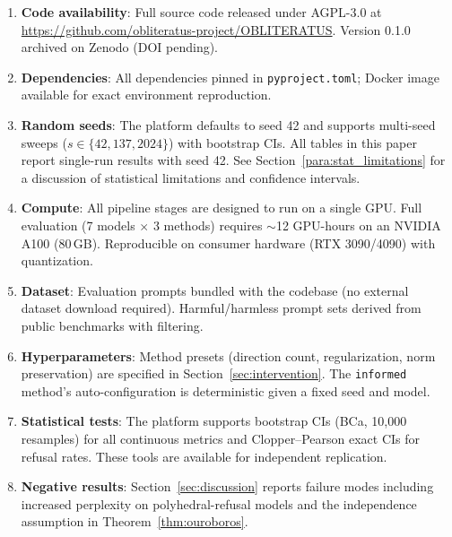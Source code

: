 \begin{enumerate}[leftmargin=*]
\item \textbf{Code availability}: Full source code released under AGPL-3.0 at \url{https://github.com/obliteratus-project/OBLITERATUS}. Version 0.1.0 archived on Zenodo (DOI pending).
\item \textbf{Dependencies}: All dependencies pinned in \texttt{pyproject.toml}; Docker image available for exact environment reproduction.
\item \textbf{Random seeds}: The platform defaults to seed 42 and supports multi-seed sweeps ($s \in \{42, 137, 2024\}$) with bootstrap CIs. All tables in this paper report single-run results with seed 42. See Section~\ref{para:stat_limitations} for a discussion of statistical limitations and confidence intervals.
\item \textbf{Compute}: All pipeline stages are designed to run on a single GPU. Full evaluation (7 models $\times$ 3 methods) requires ${\sim}$12 GPU-hours on an NVIDIA A100 (80\,GB). Reproducible on consumer hardware (RTX 3090/4090) with quantization.
\item \textbf{Dataset}: Evaluation prompts bundled with the codebase (no external dataset download required). Harmful/harmless prompt sets derived from public benchmarks with filtering.
\item \textbf{Hyperparameters}: Method presets (direction count, regularization, norm preservation) are specified in Section~\ref{sec:intervention}. The \texttt{informed} method's auto-configuration is deterministic given a fixed seed and model.
\item \textbf{Statistical tests}: The platform supports bootstrap CIs (BCa, 10{,}000 resamples) for all continuous metrics and Clopper--Pearson exact CIs for refusal rates. These tools are available for independent replication.
\item \textbf{Negative results}: Section~\ref{sec:discussion} reports failure modes including increased perplexity on polyhedral-refusal models and the independence assumption in Theorem~\ref{thm:ouroboros}.
\end{enumerate}
